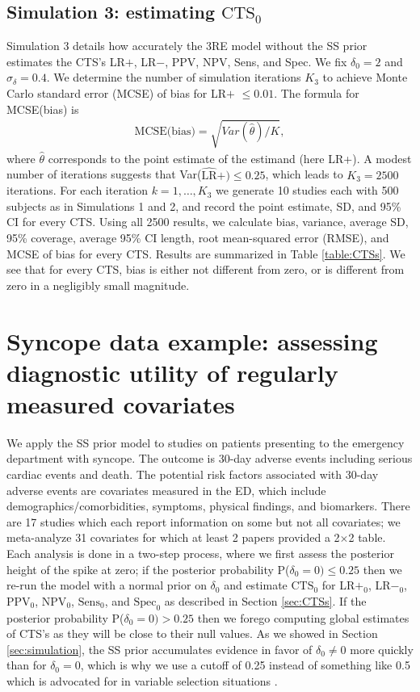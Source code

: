 \documentclass[AMA,STIX1COL]{WileyNJD-v2}
\begin{document}
\subsection{Simulation 3: estimating $\mbox{CTS}_0$} \label{sec:sim_CTS}

Simulation 3 details how accurately the 3RE model without the SS prior estimates the CTS's LR$+$, LR$-$, PPV, NPV, Sens, and Spec. We fix $\delta_0 = 2$ and $\sigma_\delta = 0.4$. We determine the number of simulation iterations $K_3$ to achieve Monte Carlo standard error (MCSE) of bias for LR$+$ $\le 0.01$. The formula for MCSE(bias) is 
\begin{align}
\mbox{MCSE(bias)} = \sqrt{Var(\hat{\theta}) / K}, \nonumber 
\end{align} 
\noindent where $\hat{\theta}$ corresponds to the point estimate of the estimand (here LR+). A modest number of iterations suggests that Var($\widehat{\mbox{LR}}+) \le 0.25$, which leads to $K_3 = 2500$ iterations. For each iteration $k = 1, \dots, K_3$ we generate 10 studies each with 500 subjects as in Simulations 1 and 2, and record the point estimate, SD, and 95\% CI for every CTS. Using all 2500 results, we calculate bias, variance, average SD, 95\% coverage, average 95\% CI length, root mean-squared error (RMSE), and MCSE of bias for every CTS. Results are summarized in Table \ref{table:CTSs}. We see that for every CTS, bias is either not different from zero, or is different from zero in a negligibly small magnitude. 

\section{Syncope data example: assessing diagnostic utility of regularly measured covariates} \label{sec:syncope}

We apply the SS prior model to studies on patients presenting to the emergency department with syncope. The outcome is 30-day adverse events including serious cardiac events and death. The potential risk factors associated with 30-day adverse events are covariates measured in the ED, which include demographics/comorbidities, symptoms, physical findings, and biomarkers. There are 17 studies which each report information on some but not all covariates; we meta-analyze 31 covariates for which at least 2 papers provided a 2$\times$2 table. Each analysis is done in a two-step process, where we first assess the posterior height of the spike at zero; if the posterior probability P($\delta_0 = 0) \le 0.25$ then we re-run the model with a normal prior on $\delta_0$ and estimate $\mbox{CTS}_0$ for LR$+_0$, LR$-_0$, $\mbox{PPV}_0$, $\mbox{NPV}_0$, $\mbox{Sens}_0$, and $\mbox{Spec}_0$ as described in Section \ref{sec:CTSs}. If the posterior probability P($\delta_0 = 0) > 0.25$ then we forego computing global estimates of CTS's as they will be close to their null values. As we showed in Section \ref{sec:simulation}, the SS prior accumulates evidence in favor of $\delta_0 \ne 0$ more quickly than for $\delta_0 = 0$, which is why we use a cutoff of 0.25 instead of something like 0.5 which is advocated for in variable selection situations \cite{barbieri2004}. 
\end{document}

